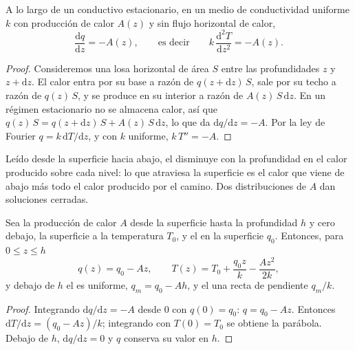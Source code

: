 \begin{theorem}\label{thm:b1:heat-budget:balance}
A lo largo de un  conductivo estacionario, en un medio de conductividad uniforme $k$ con producción de calor $A(z)$ y sin
flujo horizontal de calor,
\[
  \frac{\mathrm dq}{\mathrm dz} = -A(z), \qquad\text{es decir}\qquad
  k\,\frac{\mathrm d^2T}{\mathrm dz^2} = -A(z).
\]
\end{theorem}

\begin{proof}
Consideremos una losa horizontal de área $S$ entre las profundidades $z$ y $z +
\mathrm dz$. El calor entra por su base a razón de
$q(z + \mathrm dz)\,S$, sale por su techo a razón de $q(z)\,S$, y se produce en su interior a razón de $A(z)\,S\,\mathrm dz$. En un
régimen estacionario no se almacena calor, así que $q(z)\,S = q(z + \mathrm dz)\,S + A(z)\,S\,\mathrm dz$, lo que da
$\mathrm dq/\mathrm dz = -A$. Por la ley de Fourier $q = k\,\mathrm dT/\mathrm dz$, y con $k$ uniforme, $k\,T'' = -A$.
\end{proof}

Leído desde la superficie hacia abajo, el  disminuye con la profundidad en el calor producido sobre cada nivel: lo que
atraviesa la superficie es el calor que viene de abajo más todo el calor producido por el camino. Dos distribuciones de $A$ dan
soluciones cerradas.

\begin{proposition}\label{prop:b1:heat-budget:uniform}
Sea la producción de calor $A$ desde la superficie hasta la profundidad $h$ y cero debajo, la superficie a la temperatura $T_0$, y
el  en la superficie $q_0$.
Entonces, para $0 \le z \le h$
\[
  q(z) = q_0 - A z, \qquad T(z) = T_0 + \frac{q_0 z}{k} - \frac{A z^2}{2k},
\]
y debajo de $h$ el  es uniforme, $q_m = q_0 - A h$, y el  una recta de pendiente $q_m/k$.
\end{proposition}

\begin{proof}
Integrando $\mathrm dq/\mathrm dz = -A$ desde $0$ con $q(0) = q_0$: $q = q_0 -
Az$. Entonces $\mathrm dT/\mathrm dz = (q_0 - Az)/k$;
integrando con $T(0) = T_0$ se obtiene la parábola. Debajo de $h$, $\mathrm dq/\mathrm dz = 0$ y $q$ conserva su valor en $h$.
\end{proof}

